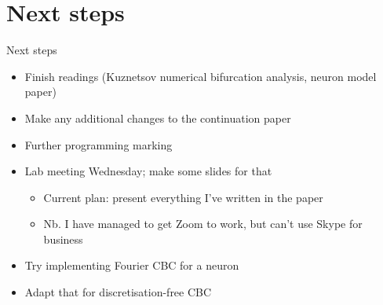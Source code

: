 \documentclass[presentation]{beamer}
\begin{document}
\section{Next steps}
\label{sec:org855ef78}
\begin{frame}[label={sec:org84f33e4}]{Next steps}
\begin{itemize}
\item Finish readings (Kuznetsov numerical bifurcation analysis, neuron model paper)
\item Make any additional changes to the continuation paper
\item Further programming marking
\item Lab meeting Wednesday; make some slides for that
\begin{itemize}
\item Current plan: present everything I've written in the paper
\item Nb. I have managed to get Zoom to work, but can't use Skype for business
\end{itemize}
\item Try implementing Fourier CBC for a neuron
\item Adapt that for discretisation-free CBC
\end{itemize}
\end{frame}
\end{document}
